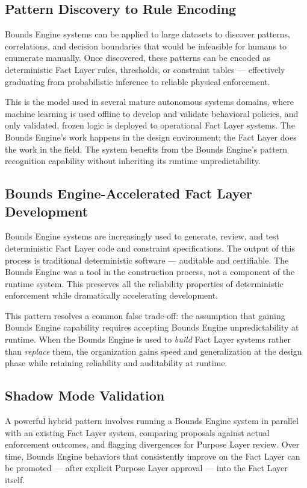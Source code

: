 \documentclass[12pt]{article}
\theoremstyle{plain}
\begin{document}
\subsection{Pattern Discovery to Rule Encoding}

Bounds Engine systems can be applied to large datasets to discover patterns, correlations, and decision boundaries that would be infeasible for humans to enumerate manually. Once discovered, these patterns can be encoded as deterministic Fact Layer rules, thresholds, or constraint tables --- effectively graduating from probabilistic inference to reliable physical enforcement.

This is the model used in several mature autonomous systems domains, where machine learning is used offline to develop and validate behavioral policies, and only validated, frozen logic is deployed to operational Fact Layer systems. The Bounds Engine's work happens in the design environment; the Fact Layer does the work in the field. The system benefits from the Bounds Engine's pattern recognition capability without inheriting its runtime unpredictability.

\subsection{Bounds Engine-Accelerated Fact Layer Development}

Bounds Engine systems are increasingly used to generate, review, and test deterministic Fact Layer code and constraint specifications. The output of this process is traditional deterministic software --- auditable and certifiable. The Bounds Engine was a tool in the construction process, not a component of the runtime system. This preserves all the reliability properties of deterministic enforcement while dramatically accelerating development.

This pattern resolves a common false trade-off: the assumption that gaining Bounds Engine capability requires accepting Bounds Engine unpredictability at runtime. When the Bounds Engine is used to \textit{build} Fact Layer systems rather than \textit{replace} them, the organization gains speed and generalization at the design phase while retaining reliability and auditability at runtime.

\subsection{Shadow Mode Validation}

A powerful hybrid pattern involves running a Bounds Engine system in parallel with an existing Fact Layer system, comparing proposals against actual enforcement outcomes, and flagging divergences for Purpose Layer review. Over time, Bounds Engine behaviors that consistently improve on the Fact Layer can be promoted --- after explicit Purpose Layer approval --- into the Fact Layer itself.
\end{document}
